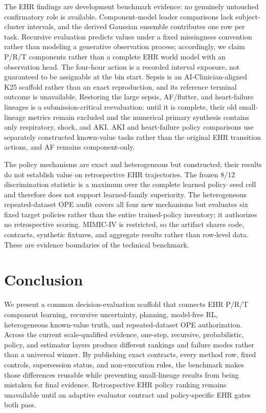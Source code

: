 \documentclass[sigconf,review]{acmart}
\begin{document}
The EHR findings are development benchmark evidence: no genuinely untouched confirmatory role is available. Component-model leader comparisons lack subject-cluster intervals, and the derived Gaussian ensemble contributes one row per task. Recursive evaluation predicts values under a fixed missingness convention rather than modeling a generative observation process; accordingly, we claim P/R/T components rather than a complete EHR world model with an observation head. The four-hour action is a recorded interval exposure, not guaranteed to be assignable at the bin start. Sepsis is an AI-Clinician-aligned K25 scaffold rather than an exact reproduction, and its reference terminal outcome is unavailable. Restoring the large sepsis, AF/flutter, and heart-failure lineages is a submission-critical reevaluation: until it is complete, their old small-lineage metrics remain excluded and the numerical primary synthesis contains only respiratory, shock, and AKI. AKI and heart-failure policy comparisons use separately constructed known-value tasks rather than the original EHR transition actions, and AF remains component-only.

The policy mechanisms are exact and heterogeneous but constructed; their results do not establish value on retrospective EHR trajectories. The frozen 8/12 discrimination statistic is a maximum over the complete learned policy--seed cell and therefore does not support learned-family superiority. The heterogeneous repeated-dataset OPE audit covers all four new mechanisms but evaluates six fixed target policies rather than the entire trained-policy inventory; it authorizes no retrospective scoring. MIMIC-IV is restricted, so the artifact shares code, contracts, synthetic fixtures, and aggregate results rather than row-level data. These are evidence boundaries of the technical benchmark.

\section{Conclusion}

We present a common decision-evaluation scaffold that connects EHR P/R/T component learning, recursive uncertainty, planning, model-free RL, heterogeneous known-value truth, and repeated-dataset OPE authorization. Across the current scale-qualified evidence, one-step, recursive, probabilistic, policy, and estimator layers produce different rankings and failure modes rather than a universal winner. By publishing exact contracts, every method row, fixed controls, supersession status, and non-execution rules, the benchmark makes those differences reusable while preventing small-lineage results from being mistaken for final evidence. Retrospective EHR policy ranking remains unavailable until an adaptive evaluator contract and policy-specific EHR gates both pass.



\end{document}
